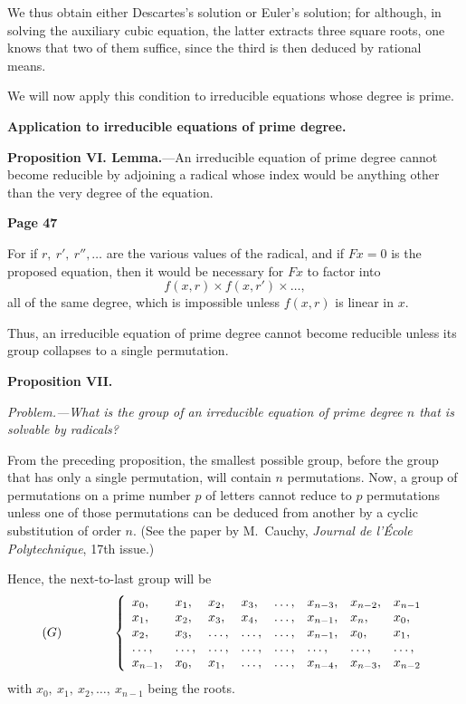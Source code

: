 \documentclass{article}
\begin{document}
We thus obtain either Descartes's solution or Euler's solution; for although, in solving the auxiliary cubic equation, the latter extracts three square roots, one knows that two of them suffice, since the third is then deduced by rational means.

We will now apply this condition to irreducible equations whose degree is prime.

\textbf{Application to irreducible equations of prime degree.}

\textbf{Proposition VI. Lemma.}---An irreducible equation of prime degree cannot become reducible by adjoining a radical whose index would be anything other than the very degree of the equation.

\bigskip

\centerline{\textbf{Page 47}}

For if $r,\ r',\ r'',\dots$ are the various values of the radical, and if $Fx = 0$ is the proposed equation, then it would be necessary for $Fx$ to factor into
\[
f(x,r)\times f(x,r')\times \dots,
\]
all of the same degree, which is impossible unless $f(x,r)$ is linear in $x$. 

Thus, an irreducible equation of prime degree cannot become reducible unless its group collapses to a single permutation.

\textbf{Proposition VII.}

\emph{Problem.---What is the group of an irreducible equation of prime degree $n$ that is solvable by radicals?}

From the preceding proposition, the smallest possible group, before the group that has only a single permutation, will contain $n$ permutations. Now, a group of permutations on a prime number $p$ of letters cannot reduce to $p$ permutations unless one of those permutations can be deduced from another by a cyclic substitution of order $n.$ (See the paper by M.\ Cauchy, \emph{Journal de l'École Polytechnique}, 17th issue.)

Hence, the next-to-last group will be
\[
(G)\quad\quad\quad\quad \left\{
\begin{array}{l l l l l l l l}
x_0, & x_1, & x_2, & x_3, & \dots, & x_{n-3}, & x_{n-2}, & x_{n-1} \\
x_1, & x_2, & x_3, & x_4, & \dots, & x_{n-1}, & x_n, & x_0, \\
x_2, & x_3, & \dots, &  \dots, &  \dots, & x_{n-1}, & x_0, & x_1, \\
\dots, & \dots, & \dots, & \dots, & \dots, & \dots, & \dots, & \dots, \\
x_{n-1}, & x_0, & x_{1}, & \dots, & \dots, & x_{n-4}, & x_{n-3}, & x_{n-2}
\end{array}
\right.
\]
with $x_0,\ x_1,\ x_2,\dots,\ x_{n-1}$ being the roots.
\end{document}
